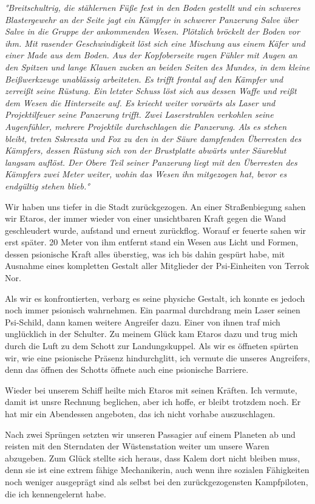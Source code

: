 \documentclass[11pt]{article}
\begin{document}
\emph{°Breitschultrig, die stählernen Füße fest in den Boden gestellt
und ein schweres Blastergewehr an der Seite jagt ein Kämpfer in schwerer
Panzerung Salve über Salve in die Gruppe der ankommenden Wesen.
Plötzlich bröckelt der Boden vor ihm. Mit rasender Geschwindigkeit löst
sich eine Mischung aus einem Käfer und einer Made aus dem Boden. Aus der
Kopfoberseite ragen Fühler mit Augen an den Spitzen und lange Klauen
zucken an beiden Seiten des Mundes, in dem kleine Beißwerkzeuge
unablässig arbeiteten. Es trifft frontal auf den Kämpfer und zerreißt
seine Rüstung. Ein letzter Schuss löst sich aus dessen Waffe und reißt
dem Wesen die Hinterseite auf. Es kriecht weiter vorwärts als Laser und
Projektilfeuer seine Panzerung trifft. Zwei Laserstrahlen verkohlen
seine Augenfühler, mehrere Projektile durchschlagen die Panzerung. Als
es stehen bleibt, treten Sskreszta und Fox zu den in der Säure
dampfenden Überresten des Kämpfers, dessen Rüstung sich von der
Brustplatte abwärts unter Säureblut langsam auflöst. Der Obere Teil
seiner Panzerung liegt mit den Überresten des Kämpfers zwei Meter
weiter, wohin das Wesen ihn mitgezogen hat, bevor es endgültig stehen
blieb.°}

Wir haben uns tiefer in die Stadt zurückgezogen. An einer Straßenbiegung
sahen wir Etaros, der immer wieder von einer unsichtbaren Kraft gegen
die Wand geschleudert wurde, aufstand und erneut zurückflog. Worauf er
feuerte sahen wir erst später. 20 Meter von ihm entfernt stand ein Wesen
aus Licht und Formen, dessen psionische Kraft alles überstieg, was ich
bis dahin gespürt habe, mit Ausnahme eines kompletten Gestalt aller
Mitglieder der Psi-Einheiten von Terrok Nor.

Als wir es konfrontierten, verbarg es seine physiche Gestalt, ich konnte
es jedoch noch immer psionisch wahrnehmen. Ein paarmal durchdrang mein
Laser seinen Psi-Schild, dann kamen weitere Angreifer dazu. Einer von
ihnen traf mich unglücklich in der Schulter. Zu meinem Glück kam Etaros
dazu und trug mich durch die Luft zu dem Schott zur Landungskuppel. Als
wir es öffneten spürten wir, wie eine psionische Präsenz hindurchglitt,
ich vermute die unseres Angreifers, denn das öffnen des Schotts öffnete
auch eine psionische Barriere.

Wieder bei unserem Schiff heilte mich Etaros mit seinen Kräften. Ich
vermute, damit ist unsre Rechnung beglichen, aber ich hoffe, er bleibt
trotzdem noch. Er hat mir ein Abendessen angeboten, das ich nicht
vorhabe auszuschlagen.

Nach zwei Sprüngen setzten wir unseren Passagier auf einem Planeten ab
und reisten mit den Sterndaten der Wüstenstation weiter um unsere Waren
abzugeben. Zum Glück stellte sich heraus, dass Kalem dort nicht bleiben
muss, denn sie ist eine extrem fähige Mechanikerin, auch wenn ihre
sozialen Fähigkeiten noch weniger ausgeprägt sind als selbst bei den
zurückgezogensten Kampfpiloten, die ich kennengelernt habe.
\end{document}
